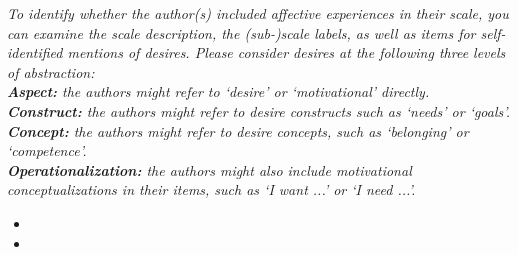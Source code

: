 \documentclass[10pt,a4paper]{protocol}
\begin{document}
\textit{To identify whether the author(s) included affective experiences in their scale, you can examine the scale description, the (sub-)scale labels, as well as items for self-identified mentions of desires. Please consider desires at the following three levels of abstraction:\\
\textbf{Aspect:} the authors might refer to `desire' or `motivational' directly.\\
\textbf{Construct:} the authors might refer to desire constructs such as `needs' or `goals'.\\
\textbf{Concept:} the authors might refer to desire concepts, such as `belonging' or `competence'.\\
\textbf{Operationalization:} the authors might also include motivational conceptualizations in their items, such as `I want ...' or `I need ...'.}
\vspace{0.5em}
\begin{itemize}
	\item {}
	\item {}
\end{itemize}
\divider

\clearpage
\vspace*{2em}

\end{document}

